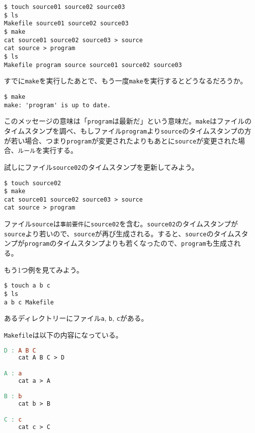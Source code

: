\begin{lstlisting}[style=terminal]
$ touch source01 source02 source03
$ ls
Makefile source01 source02 source03
$ make
cat source01 source02 source03 > source
cat source > program
$ ls
Makefile program source source01 source02 source03
\end{lstlisting}

すでに\texttt{make}を実行したあとで、もう一度\texttt{make}を実行するとどうなるだろうか。

\ifTombow\pagebreak\fi
\begin{lstlisting}[style=terminal]
$ make
make: 'program' is up to date.
\end{lstlisting}

このメッセージの意味は「\texttt{program}は最新だ」という意味だ。\texttt{make}はファイルのタイムスタンプを調べ、もしファイル\texttt{program}より\texttt{source}のタイムスタンプの方が若い場合、つまり\texttt{program}が変更されたよりもあとに\texttt{source}が変更された場合、\texttt{ルール}を実行する。

試しにファイル\texttt{source02}のタイムスタンプを更新してみよう。

\begin{lstlisting}[style=terminal]
$ touch source02
$ make
cat source01 source02 source03 > source
cat source > program
\end{lstlisting}

ファイル\texttt{source}は\texttt{事前要件}に\texttt{source02}を含む。\texttt{source02}のタイムスタンプが\texttt{source}より若いので、\texttt{source}が再び生成される。すると、\texttt{source}のタイムスタンプが\texttt{program}のタイムスタンプよりも若くなったので、\texttt{program}も生成される。

もう1つ例を見てみよう。

\begin{lstlisting}[style=terminal]
$ touch a b c
$ ls
a b c Makefile
\end{lstlisting}

あるディレクトリーにファイル\texttt{a}, \texttt{b}, \texttt{c}がある。

\texttt{Makefile}は以下の内容になっている。

\begin{lstlisting}[language=make]
D : A B C
    cat A B C > D

A : a
    cat a > A

B : b
    cat b > B

C : c
    cat c > C
\end{lstlisting}

